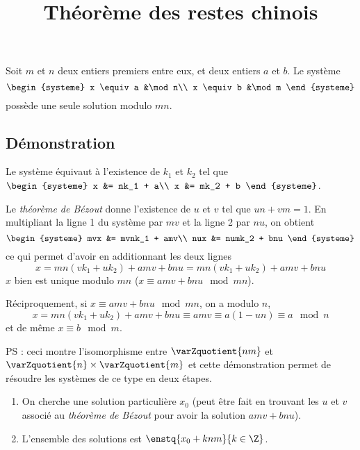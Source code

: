 \documentclass[fontsize=12pt,twoside=false,parskip=half]{scrartcl}
\title{Théorème des restes chinois}
\date{}
\author{}
\begin{document}
\maketitle
   \begin{Theoreme}
      Soit $m$ et $n$ deux entiers premiers entre eux, et deux entiers $a$ et $b$. Le système
      \[
         \begin{systeme}
            x \equiv a &\mod n\\
            x \equiv b &\mod m
         \end{systeme}
      \]
      possède une seule solution modulo $mn$.
   \end{Theoreme}
   \subsection{Démonstration}
      Le système équivaut à l’existence de $k_1$ et $k_2$ tel que
      $\begin{systeme}
            x &= nk_1 + a\\
            x &= mk_2 + b
         \end{systeme}$.
         
      Le \emph{théorème de Bézout} donne l’existence de $u$ et $v$ tel que $un + vm = 1$. En multipliant la ligne 1 du 
      système par $mv$ et la ligne 2 par $nu$, on obtient
      \[
         \begin{systeme}
            mvx &= mvnk_1 + amv\\
            nux &= numk_2 + bnu
         \end{systeme}
      \]
      ce qui permet d’avoir en additionnant les deux lignes
      \[
         x = mn(vk_1 + uk_2) + amv + bnu = mn(vk_1 + uk_2) + amv + bnu
      \]
      $x$ bien est unique modulo $mn$ ($x \equiv amv + bnu \mod mn$).
      
 
      Réciproquement, si $x \equiv amv + bnu \mod mn$, on a modulo $n$,
      \[
         x = mn(vk_1 + uk_2) + amv + bnu \equiv amv \equiv a(1 - un) \equiv a \mod n 
      \]
      et de même $x \equiv b \mod m$.
      
      PS : ceci montre l’isomorphisme entre $\varZquotient{nm}$ et $\varZquotient{n} \times \varZquotient{m}$
      et cette démonstration permet de résoudre les systèmes de ce type en deux étapes.
      \begin{enumerate}
         \item On cherche une solution particulière $x_0$ (peut être fait en trouvant les $u$ et $v$ associé au
               \emph{théorème de Bézout} pour avoir la solution $amv + bnu$).
         \item L’ensemble des solutions est $\enstq{x_0 + knm}{k \in \Z}$.
      \end{enumerate}
\end{document}
